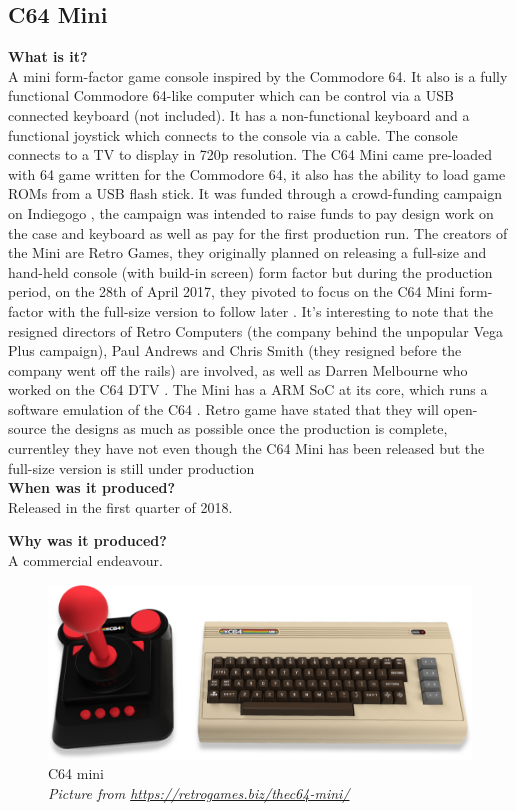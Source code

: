 \subsection{C64 Mini}
\textbf{What is it?}\\
A mini form-factor game console inspired by the Commodore 64. It also is a fully functional Commodore 64-like computer which can be control via a USB connected keyboard (not included). It has a non-functional keyboard and a functional joystick which connects to the console via a cable. The console connects to a TV to display in 720p resolution. The C64 Mini came pre-loaded with 64 game written for the Commodore 64, it also has the ability to load game ROMs from a USB flash stick. It was funded through a crowd-funding campaign on Indiegogo 
\cite{RN124}, the campaign was intended to raise funds to pay design work on the case and keyboard as well as pay for the first production run. The creators of the Mini are Retro Games, they originally planned on releasing a full-size and hand-held console (with build-in screen) form factor but during the production period, on the 28th of April 2017, they pivoted to focus on the C64 Mini form-factor with the full-size version to follow later 
\cite{RN160}. It's interesting to note that the resigned directors of Retro Computers (the company behind the unpopular Vega Plus campaign), Paul Andrews and Chris Smith (they resigned before the company went off the rails) are involved, as well as Darren Melbourne who worked on the C64 DTV 
\cite{RN127}. The Mini has a ARM SoC at its core, which runs a software emulation of the C64 
\cite{RN160}. Retro game have stated that they will open-source the designs as much as possible once the production is complete, currentley they have not even though the C64 Mini has been released but the full-size version is still under production\\

\textbf{When was it produced?}\\
Released in the first quarter of 2018.

\textbf{Why was it produced?}\\
A commercial endeavour. 

\begin{figure} \begin{center}
\includegraphics[width=.3\linewidth]{pics/C64_mini} 
\end{center} 
\caption{C64 mini\\ \textit{\small{Picture from \url {https://retrogames.biz/thec64-mini/}}}}
\label{C64_mini}
\end{figure}

